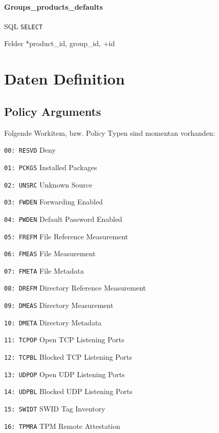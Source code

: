 \documentclass[10pt,a4paper]{scrartcl}
\begin{document}
\paragraph{Groups\_products\_defaults}
\begin{description*}
	\item[SQL] \texttt{SELECT}
	\item[Felder] *product\_id, group\_id, +id
\end{description*} 

\section{Daten Definition}

\subsection{Policy Arguments}

Folgende Workitem, bzw. Policy Typen sind momentan vorhanden:
\begin{description*}
    \item[\texttt{00: RESVD}] Deny
    \item[\texttt{01: PCKGS}] Installed Packages
    \item[\texttt{02: UNSRC}] Unknown Source
    \item[\texttt{03: FWDEN}] Forwarding Enabled
    \item[\texttt{04: PWDEN}] Default Password Enabled
    \item[\texttt{05: FREFM}] File Reference Measurement
    \item[\texttt{06: FMEAS}] File Measurement 
    \item[\texttt{07: FMETA}] File Metadata
    \item[\texttt{08: DREFM}] Directory Reference Measurement
    \item[\texttt{09: DMEAS}] Directory Measurement
    \item[\texttt{10: DMETA}] Directory Metadata
    \item[\texttt{11: TCPOP}] Open TCP Listening Ports
    \item[\texttt{12: TCPBL}] Blocked TCP Listening Ports
    \item[\texttt{13: UDPOP}] Open UDP Listening Ports
    \item[\texttt{14: UDPBL}] Blocked UDP Listening Ports
    \item[\texttt{15: SWIDT}] SWID Tag Inventory
    \item[\texttt{16: TPMRA}] TPM Remote Attestation
\end{description*}
\end{document}
